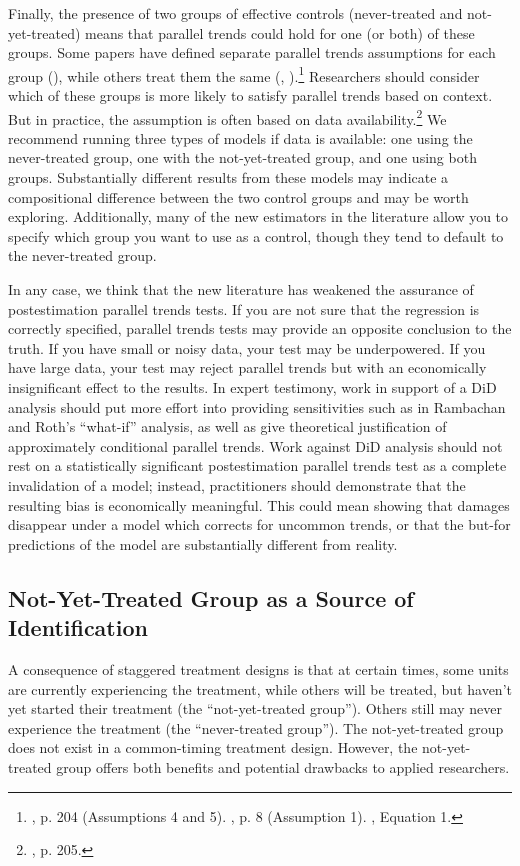 \documentclass[12pt]{article}
\begin{document}
Finally, the presence of two groups of effective controls (never-treated and not-yet-treated) means that parallel trends could hold for one (or both) of these groups. Some papers have defined separate parallel trends assumptions for each group (\citet{CS2021}), while others treat them the same (\citet{borusyak2024revisiting}, \citet{gardner2022a}).\footnote{\citet{CS2021}, p. 204 (Assumptions 4 and 5). \citet{borusyak2024revisiting}, p. 8 (Assumption 1). \citet{gardner2022a}, Equation 1.}  Researchers should consider which of these groups is more likely to satisfy parallel trends based on context. But in practice, the assumption is often based on data availability.\footnote{\citet{CS2021}, p. 205.}  We recommend running three types of models if data is available: one using the never-treated group, one with the not-yet-treated group, and one using both groups. Substantially different results from these models may indicate a compositional difference between the two control groups and may be worth exploring. Additionally, many of the new estimators in the literature allow you to specify which group you want to use as a control, though they tend to default to the never-treated group.

In any case, we think that the new literature has weakened the assurance of postestimation parallel trends tests. If you are not sure that the regression is correctly specified, parallel trends tests may provide an opposite conclusion to the truth. If you have small or noisy data, your test may be underpowered. If you have large data, your test may reject parallel trends but with an economically insignificant effect to the results. In expert testimony, work in support of a DiD analysis should put more effort into providing sensitivities such as in Rambachan and Roth’s “what-if” analysis, as well as give theoretical justification of approximately conditional parallel trends. Work against DiD analysis should not rest on a statistically significant postestimation parallel trends test as a complete invalidation of a model; instead, practitioners should demonstrate that the resulting bias is economically meaningful. This could mean showing that damages disappear under a model which corrects for uncommon trends, or that the but-for predictions of the model are substantially different from reality.
\subsection{Not-Yet-Treated Group as a Source of Identification}
A consequence of staggered treatment designs is that at certain times, some units are currently experiencing the treatment, while others will be treated, but haven’t yet started their treatment (the “not-yet-treated group”). Others still may never experience the treatment (the “never-treated group”). The not-yet-treated group does not exist in a common-timing treatment design. However, the not-yet-treated group offers both benefits and potential drawbacks to applied researchers.
\end{document}
